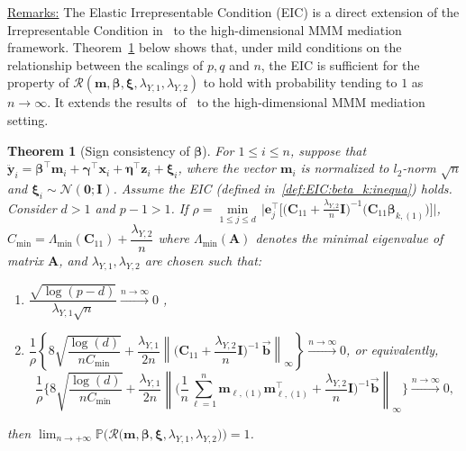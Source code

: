 \documentclass[
  12pt]{article}
\newtheorem{thm}{Theorem}[section]
\def\M{\mathbf{m}}
\def\X{\mathbf{x}}
\def\Z{\mathbf{z}}
\begin{document}
\underline{Remarks:} The Elastic Irrepresentable Condition (EIC) is a direct extension of the Irrepresentable Condition in~\citep{Jia-Yu:2010:model.consistency.elastic-net} to the high-dimensional MMM mediation framework.
Theorem~\ref{thm:consistency.elastic.net.estimator:beta_k} below shows that, under mild conditions on the relationship between the scalings of $p,q$ and $n$, the EIC is sufficient for the property of $\mathcal{R}(\M, \bm{\beta}, \bm{\xi}, \lambda_{Y,1}, \lambda_{Y,2})$ to hold with probability tending to $1$ as $n \rightarrow \infty$. It extends the results of~\citep{Jia-Yu:2010:model.consistency.elastic-net} to the high-dimensional MMM mediation setting.
\begin{thm}[Sign consistency of $\bm{\beta}$]
	\label{thm:consistency.elastic.net.estimator:beta_k}
	For $1 \leq i \leq n$, suppose that $\ddot{\mathbf{y}}_{i} =  \bm{\beta}^{\top} \M_{i} + \bm{\gamma}^{\top} \X_{i}  + \bm{\eta}^{\top} \Z_{i}  + \bm{\xi}_{i}$, where the vector $\M_{i}$ is normalized to $l_{2}$-norm $\sqrt{n}$ and $\bm{\xi}_{i} {\sim} \mathcal{N}(\bm{0} ; \mathbf{I})$. Assume the  EIC (defined in~\eqref{def:EIC:beta_k:inequa})  holds. Consider $d > 1$ and $p - 1 > 1$. If $\rho = \underset{1 \leq j \leq d}{ \min } \, \Big| \mathbf{e}_{j}^{\top} \Big[   \Big( \mathbf{C}_{11} + \frac{\lambda_{Y,2}}{n} \mathbf{I} \Big)^{-1} \Big(\mathbf{C}_{11} \bm{\beta}_{k , (1)} \Big)  \Big]  \Big| $, $C_{\min} = \Lambda_{\min}(\mathbf{C}_{11}) + \dfrac{\lambda_{Y,2}}{n}$ where  $\Lambda_{\min}(\mathbf{A})$ denotes the minimal eigenvalue of matrix $\mathbf{A}$, and $\lambda_{Y,1}, \lambda_{Y,2}$ are chosen such that:
	\begin{enumerate}
		\item[(a)] $\displaystyle   %
		\dfrac{ \sqrt{ \log(p-d) } }{ \lambda_{Y,1}  \sqrt{n} }  \overset{n  \rightarrow \infty}{\longrightarrow}  0 $  ,
		\item[(b)] $\displaystyle   \dfrac{1}{\rho} \left\{ 8 \sqrt{ \dfrac{\log(d) }{ n C_{\min} } } +  \dfrac{\lambda_{Y,1}}{2 n }  \left\| \Big( \mathbf{C}_{11} + \dfrac{\lambda_{Y,2}}{n} \mathbf{I} \Big)^{-1} \,  \overrightarrow{\mathbf{b}}   \right\|_{\infty}  \right\}      \overset{n   \rightarrow   \infty}{\longrightarrow}  0 $,
		or equivalently,
		\[
		\dfrac{1}{\rho}  \Bigg\{ 8 \sqrt{ \dfrac{ \log(d)   }{ n C_{\min} } }  + \dfrac{\lambda_{Y,1}}{2 n }  \left\|  \big( \dfrac{1}{n} \sum_{\ell = 1}^{n} \M_{\ell , (1)} \M_{\ell , (1)}^{\top} +  \dfrac{\lambda_{Y,2}}{n} \mathbf{I} \big)^{-1}    \overrightarrow{\mathbf{b}}   \right\|_{\infty}
		\Bigg\}  \overset{n   \rightarrow   \infty}{\longrightarrow}  0  ,
		\]
	\end{enumerate}
	then $\lim_{n   \rightarrow   +\infty} \mathbb{P} \Big( \mathcal{R} \big( \M, \bm{\beta}, \bm{\xi}, \lambda_{Y,1}, \lambda_{Y,2} \big) \Big) = 1$.
\end{thm}
\end{document}
